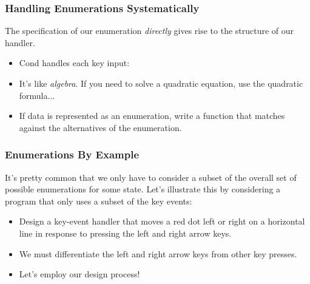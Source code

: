 \documentclass{beamer}
\begin{document}
\begin{frame}
  \frametitle{Handling Enumerations Systematically}
  The specification of our enumeration \emph{directly} gives rise
  to the structure of our handler.
  \begin{itemize}
  \item<2-> Cond handles each key input:
    \keHandler
  \item<3-> It's like \emph{algebra}. If you need to solve a quadratic
    equation, use the quadratic formula...
  \item<4-> If data is represented as an enumeration, write a function
    that matches against the alternatives of the enumeration.
  \end{itemize}
\end{frame}

\begin{frame}
  \frametitle{Enumerations By Example}
  It's pretty common that we only have to consider a subset of the
  overall set of possible enumerations for some state. Let's illustrate
  this by considering a program that only uses a subset of the key events:
  \begin{itemize}
  \item<2-> Design a key-event handler that moves a red dot left or right on a horizontal line in response to pressing the left and right arrow keys.
  \item<3-> We must differentiate the left and right arrow keys from
    other key presses.
  \item<4-> Let's employ our design process!
  \end{itemize}
\end{frame}



\end{document}
